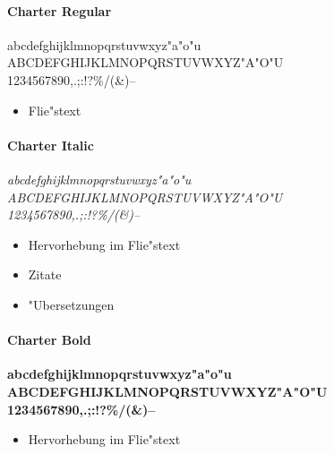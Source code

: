 \documentclass[twoside,colorback,accentcolor=tud4c,11pt]{tudreport}
\begin{document}
    \paragraph{Charter Regular}
      \hfill%
      \begin{minipage}{\textwidth-\the\parindent}
        \normalfont\normalsize
        \noindent
        abcdefghijklmnopqrstuvwxyz"a"o"u\\
        ABCDEFGHIJKLMNOPQRSTUVWXYZ"A"O"U\\
        1234567890,.;:!?\glqq\grqq@\texteuro\%/(\&)--
      \end{minipage}
      \begin{itemize}
        \item Flie"stext
      \end{itemize}

    \paragraph{Charter Italic}
      \hfill%
      \begin{minipage}{\textwidth-\the\parindent}
        \it
        \noindent
        abcdefghijklmnopqrstuvwxyz"a"o"u\\
        ABCDEFGHIJKLMNOPQRSTUVWXYZ"A"O"U\\
        1234567890,.;:!?\glqq\grqq@\texteuro\%/(\&)--
      \end{minipage}
      \begin{itemize}
        \item Hervorhebung im Flie"stext
        \item Zitate
        \item "Ubersetzungen
      \end{itemize}

    \paragraph{Charter Bold}
      \hfill%
      \begin{minipage}{\textwidth-\the\parindent}
        \bf
        \noindent
        abcdefghijklmnopqrstuvwxyz"a"o"u\\
        ABCDEFGHIJKLMNOPQRSTUVWXYZ"A"O"U\\
        1234567890,.;:!?\glqq\grqq@\texteuro\%/(\&)--
      \end{minipage}
      \begin{itemize}
        \item Hervorhebung im Flie"stext
      \end{itemize}
    
\end{document}
